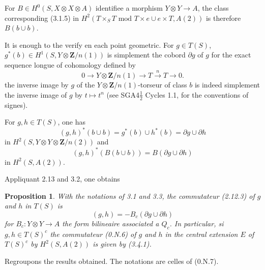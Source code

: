 \documentclass[11pt,a4paper]{article}
\theoremstyle{plain}
\newtheorem{proposition}[theorem]{Proposition}
\theoremstyle{definition}
\begin{document}
For $B \in H^0(S, X \otimes X \otimes A)$ identifiee a morphism $Y \otimes Y \to A$, the class corresponding (3.1.5) in $H^2(T \times_S T \text{ mod } T \times e \cup e \times T, A(2))$ is therefore $B(b \cup b)$.

It is enough to the verify en each point geometric. For $g \in T(S)$, $g^*(b) \in H^1(S, Y \otimes \mathbf{Z}/n(1))$ is simplement the cobord $\partial g$ of $g$ for the exact sequence longue of cohomology defined by
\begin{equation}\label{3.3.1}
0 \to Y \otimes \mathbf{Z}/n(1) \to T \xrightarrow{\,n\,} T \to 0.
\end{equation}
the inverse image by $g$ of the $Y \otimes \mathbf{Z}/n(1)$-torseur of class $b$ is indeed simplement the inverse image of $g$ by $t \mapsto t^n$ (see SGA4$\frac{1}{2}$ Cycles 1.1, for the conventions of signes).

For $g, h \in T(S)$, one has
\[
(g, h)^*(b \cup b) = g^*(b) \cup h^*(b) = \partial g \cup \partial h
\]
in $H^2(S, Y \otimes Y \otimes \mathbf{Z}/n(2))$ and
\[
(g, h)^*(B(b \cup b)) = B(\partial g \cup \partial h)
\]
in $H^2(S, A(2))$.

Appliquant 2.13 and 3.2, one obtains
\begin{proposition}\label{3.4}
With the notations of 3.1 and 3.3, the commutateur (2.12.3) of $g$ and $h$ in $T(S)$ is
\begin{equation}\label{3.4.1}
(g, h) = -B_c(\partial g \cup \partial h)
\end{equation}
for $B_c : Y \otimes Y \to A$ the form bilineaire associated a $Q_c$. In particular, si $g, h \in T(S)^c$ the commutateur (0.N.6) of $g$ and $h$ in the central extension $E$ of $T(S)^c$ by $H^2(S, A(2))$ is given by (3.4.1).
\end{proposition}

Regroupons the results obtained. The notations are celles of (0.N.7).
\end{document}
